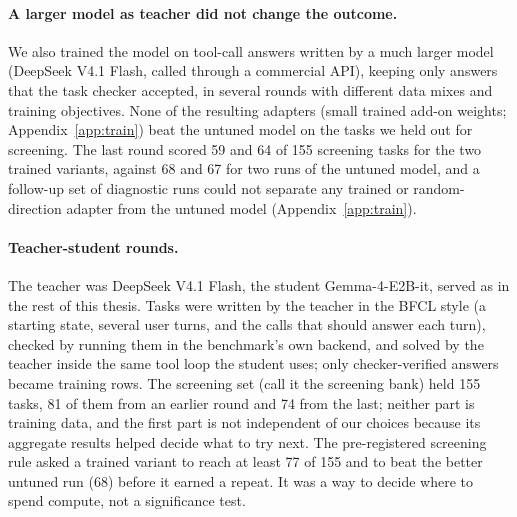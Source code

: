 
\paragraph{A larger model as teacher did not change the outcome.} We also trained the model on tool-call answers written by a much larger model (DeepSeek V4.1 Flash, called through a commercial API), keeping only answers that the task checker accepted, in several rounds with different data mixes and training objectives. None of the resulting adapters (small trained add-on weights; Appendix~\ref{app:train}) beat the untuned model on the tasks we held out for screening. The last round scored 59 and 64 of 155 screening tasks for the two trained variants, against 68 and 67 for two runs of the untuned model, and a follow-up set of diagnostic runs could not separate any trained or random-direction adapter from the untuned model (Appendix~\ref{app:train}). %

\paragraph{Teacher-student rounds.} The teacher was DeepSeek V4.1 Flash, the student Gemma-4-E2B-it, served as in the rest of this thesis. Tasks were written by the teacher in the BFCL style (a starting state, several user turns, and the calls that should answer each turn), checked by running them in the benchmark's own backend, and solved by the teacher inside the same tool loop the student uses; only checker-verified answers became training rows. The screening set (call it the screening bank) held 155 tasks, 81 of them from an earlier round and 74 from the last; neither part is training data, and the first part is not independent of our choices because its aggregate results helped decide what to try next. %
The pre-registered screening rule asked a trained variant to reach at least 77 of 155 and to beat the better untuned run (68) before it earned a repeat. It was a way to decide where to spend compute, not a significance test. %

